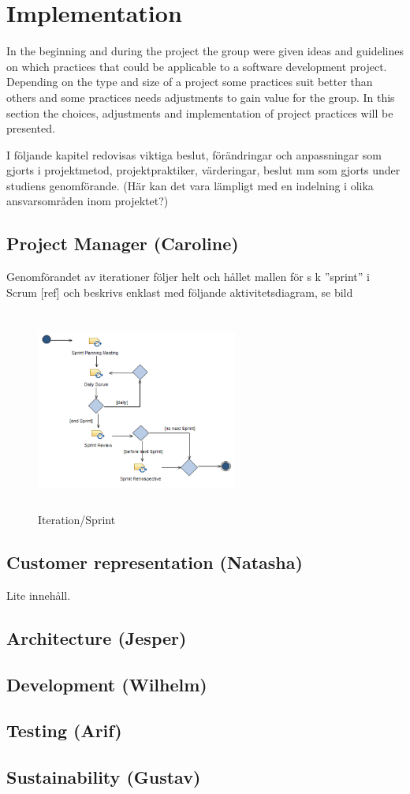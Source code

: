 
\section{Implementation}
In the beginning and during the project the group were given ideas and guidelines on which practices that could be applicable to a software development project. Depending on the type and size of a project some practices suit better than others and some practices needs adjustments to gain value for the group. In this section the choices, adjustments and implementation of project practices will be presented.



I följande kapitel redovisas viktiga beslut, förändringar och anpassningar som gjorts 
i projektmetod, projektpraktiker, värderingar, beslut mm som gjorts under studiens genomförande.
(Här kan det vara lämpligt med en indelning i olika ansvarsområden inom projektet?)

\subsection{Project Manager (Caroline)}
Genomförandet av iterationer följer helt och hållet mallen för s k ”sprint” i Scrum [ref] 
och beskrivs enklast med följande aktivitetsdiagram, se  bild
\begin{figure}[htbp]
    \centerline{\includegraphics[max height=250px, max width=250px]{Z. images/sprint.png}}
    \caption{Iteration/Sprint}
    \label{fig}
\end{figure}

\subsection{Customer representation (Natasha)}
Lite innehåll.

\subsection{Architecture (Jesper)}


\subsection{Development (Wilhelm)}


\subsection{Testing (Arif)}


\subsection{Sustainability (Gustav)}

